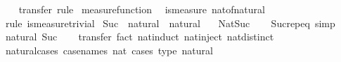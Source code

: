 \begin{isabellebody}
%
\isadelimproof
\ \ %
\endisadelimproof
%
\isatagproof
{}\isamarkupfalse%
\ transfer\ rule%
\endisatagproof
{\isafoldproof}%
%
\isadelimproof
\isanewline
%
\endisadelimproof
\isanewline
{}\isamarkupfalse%
\ {\isacharbrackleft}{\kern0pt}measure{\isacharunderscore}{\kern0pt}function{\isacharbrackright}{\kern0pt}{\isacharcolon}{\kern0pt}\isanewline
\ \ {\isachardoublequoteopen}is{\isacharunderscore}{\kern0pt}measure\ nat{\isacharunderscore}{\kern0pt}of{\isacharunderscore}{\kern0pt}natural{\isachardoublequoteclose}\isanewline
%
\isadelimproof
\ \ %
\endisadelimproof
%
\isatagproof
{}\isamarkupfalse%
\ {\isacharparenleft}{\kern0pt}rule\ is{\isacharunderscore}{\kern0pt}measure{\isacharunderscore}{\kern0pt}trivial{\isacharparenright}{\kern0pt}%
\endisatagproof
{\isafoldproof}%
%
\isadelimproof
%
\endisadelimproof
%
\isadelimdocument
%
\endisadelimdocument
%
\isatagdocument
%
\isamarkuptrue%
%
\endisatagdocument
{\isafolddocument}%
%
\isadelimdocument
%
\endisadelimdocument
{}\isamarkupfalse%
\ Suc\ {\isacharcolon}{\kern0pt}{\isacharcolon}{\kern0pt}\ {\isachardoublequoteopen}natural\ {\isasymRightarrow}\ natural{\isachardoublequoteclose}\isanewline
\ \ \ Nat{\isachardot}{\kern0pt}Suc\isanewline
%
\isadelimproof
\ \ %
\endisadelimproof
%
\isatagproof
\isacommand{{\isachardot}{\kern0pt}}\isamarkupfalse%
%
\endisatagproof
{\isafoldproof}%
%
\isadelimproof
\isanewline
%
\endisadelimproof
\isanewline
{}\isamarkupfalse%
\ Suc{\isachardot}{\kern0pt}rep{\isacharunderscore}{\kern0pt}eq\ {\isacharbrackleft}{\kern0pt}simp{\isacharbrackright}{\kern0pt}\isanewline
\isanewline
{}\isamarkupfalse%
\ {\isachardoublequoteopen}{}{\isacharcolon}{\kern0pt}{\isacharcolon}{\kern0pt}natural{\isachardoublequoteclose}\ Suc\isanewline
%
\isadelimproof
\ \ %
\endisadelimproof
%
\isatagproof
{}\isamarkupfalse%
\ {\isacharparenleft}{\kern0pt}transfer{\isacharcomma}{\kern0pt}\ fact\ nat{\isachardot}{\kern0pt}induct\ nat{\isachardot}{\kern0pt}inject\ nat{\isachardot}{\kern0pt}distinct{\isacharparenright}{\kern0pt}{\isacharplus}{\kern0pt}%
\endisatagproof
{\isafoldproof}%
%
\isadelimproof
\isanewline
%
\endisadelimproof
\isanewline
{}\isamarkupfalse%
\ natural{\isacharunderscore}{\kern0pt}cases\ {\isacharbrackleft}{\kern0pt}case{\isacharunderscore}{\kern0pt}names\ nat{\isacharcomma}{\kern0pt}\ cases\ type{\isacharcolon}{\kern0pt}\ natural{\isacharbrackright}{\kern0pt}{\isacharcolon}{\kern0pt}\isanewline

\end{isabellebody}
